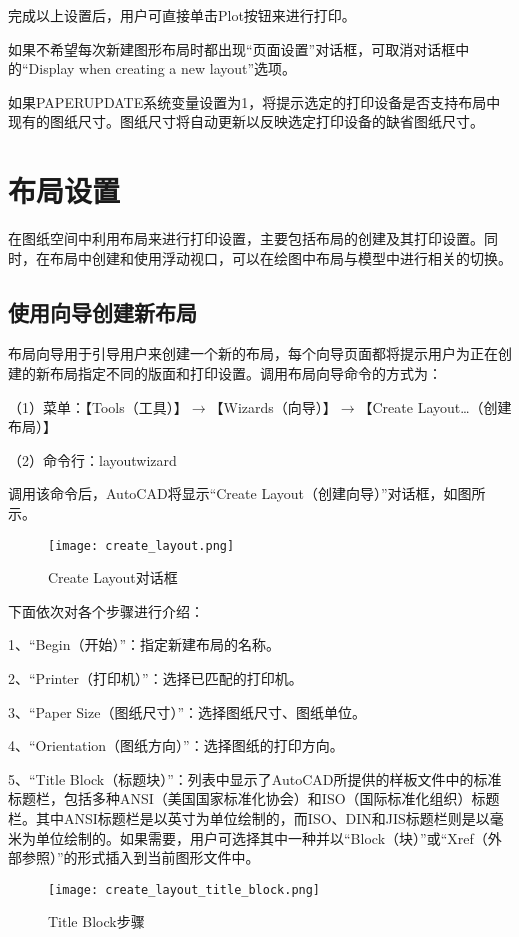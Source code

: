 完成以上设置后，用户可直接单击Plot按钮来进行打印。

如果不希望每次新建图形布局时都出现“页面设置”对话框，可取消对话框中的“Display when creating a new layout”选项。

如果PAPERUPDATE系统变量设置为1，将提示选定的打印设备是否支持布局中现有的图纸尺寸。图纸尺寸将自动更新以反映选定打印设备的缺省图纸尺寸。

\chapter{布局设置}

在图纸空间中利用布局来进行打印设置，主要包括布局的创建及其打印设置。同时，在布局中创建和使用浮动视口，可以在绘图中布局与模型中进行相关的切换。


\section{使用向导创建新布局}


布局向导用于引导用户来创建一个新的布局，每个向导页面都将提示用户为正在创建的新布局指定不同的版面和打印设置。调用布局向导命令的方式为：

（1）菜单：【Tools（工具）】$\to$【Wizards（向导）】$\to$【Create Layout…（创建布局）】

（2）命令行：layoutwizard

调用该命令后，AutoCAD将显示“Create Layout（创建向导）”对话框，如图所示。

\begin{figure}[htnp]
\centering
\texttt{[image: create\_layout.png]}
\caption{Create Layout对话框}
\end{figure}

下面依次对各个步骤进行介绍：

1、“Begin（开始）”：指定新建布局的名称。

2、“Printer（打印机）”：选择已匹配的打印机。

3、“Paper Size（图纸尺寸）”：选择图纸尺寸、图纸单位。

4、“Orientation（图纸方向）”：选择图纸的打印方向。

5、“Title Block（标题块）”：列表中显示了AutoCAD所提供的样板文件中的标准标题栏，包括多种ANSI（美国国家标准化协会）和ISO（国际标准化组织）标题栏。其中ANSI标题栏是以英寸为单位绘制的，而ISO、DIN和JIS标题栏则是以毫米为单位绘制的。如果需要，用户可选择其中一种并以“Block（块）”或“Xref（外部参照）”的形式插入到当前图形文件中。

\begin{figure}[htbp]
\centering
\texttt{[image: create\_layout\_title\_block.png]}
\caption{Title Block步骤}
\end{figure}

